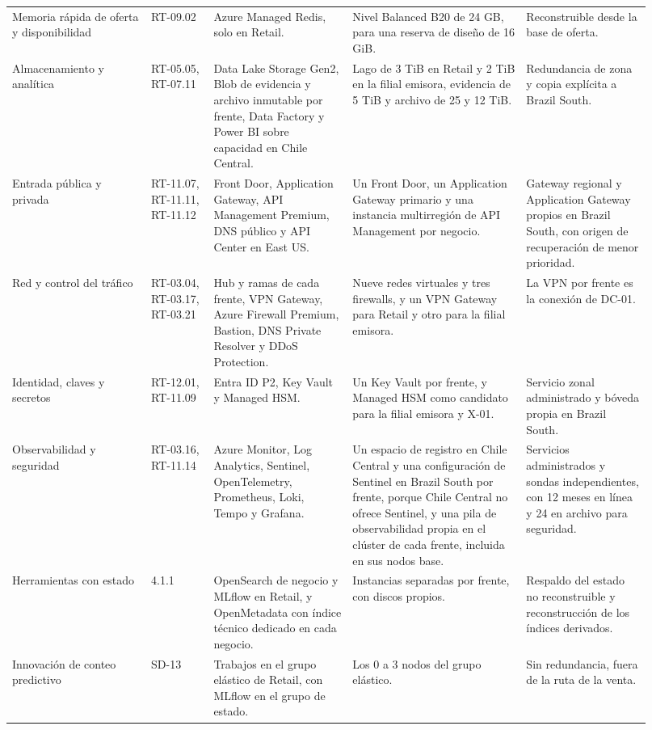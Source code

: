 \documentclass[11pt]{article}
\begin{document}
\begin{longtable}{@{}p{0.20\linewidth}p{0.09\linewidth}p{0.20\linewidth}p{0.25\linewidth}p{0.18\linewidth}@{}}
Memoria rápida de oferta y disponibilidad & RT-09.02 & Azure Managed Redis, solo en Retail. & Nivel Balanced B20 de 24 GB, para una reserva de diseño de 16 GiB. & Reconstruible desde la base de oferta. \\
Almacenamiento y analítica & RT-05.05, RT-07.11 & Data Lake Storage Gen2, Blob de evidencia y archivo inmutable por frente, Data Factory y Power BI sobre capacidad en Chile Central. & Lago de 3 TiB en Retail y 2 TiB en la filial emisora, evidencia de 5 TiB y archivo de 25 y 12 TiB. & Redundancia de zona y copia explícita a Brazil South. \\
Entrada pública y privada & RT-11.07, RT-11.11, RT-11.12 & Front Door, Application Gateway, API Management Premium, DNS público y API Center en East US. & Un Front Door, un Application Gateway primario y una instancia multirregión de API Management por negocio. & Gateway regional y Application Gateway propios en Brazil South, con origen de recuperación de menor prioridad. \\
Red y control del tráfico & RT-03.04, RT-03.17, RT-03.21 & Hub y ramas de cada frente, VPN Gateway, Azure Firewall Premium, Bastion, DNS Private Resolver y DDoS Protection. & Nueve redes virtuales y tres firewalls, y un VPN Gateway para Retail y otro para la filial emisora. & La VPN por frente es la conexión de DC-01. \\
Identidad, claves y secretos & RT-12.01, RT-11.09 & Entra ID P2, Key Vault y Managed HSM. & Un Key Vault por frente, y Managed HSM como candidato para la filial emisora y X-01. & Servicio zonal administrado y bóveda propia en Brazil South. \\
Observabilidad y seguridad & RT-03.16, RT-11.14 & Azure Monitor, Log Analytics, Sentinel, OpenTelemetry, Prometheus, Loki, Tempo y Grafana. & Un espacio de registro en Chile Central y una configuración de Sentinel en Brazil South por frente, porque Chile Central no ofrece Sentinel, y una pila de observabilidad propia en el clúster de cada frente, incluida en sus nodos base. & Servicios administrados y sondas independientes, con 12 meses en línea y 24 en archivo para seguridad. \\
Herramientas con estado & 4.1.1 & OpenSearch de negocio y MLflow en Retail, y OpenMetadata con índice técnico dedicado en cada negocio. & Instancias separadas por frente, con discos propios. & Respaldo del estado no reconstruible y reconstrucción de los índices derivados. \\
Innovación de conteo predictivo & SD-13 & Trabajos en el grupo elástico de Retail, con MLflow en el grupo de estado. & Los 0 a 3 nodos del grupo elástico. & Sin redundancia, fuera de la ruta de la venta. \\

\end{longtable}
\end{document}
